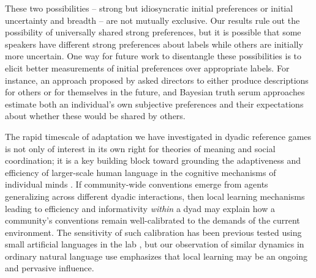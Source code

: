 \documentclass[alpha-refs]{wiley-article}
\begin{document}
These two possibilities -- strong but idiosyncratic initial preferences or initial uncertainty and breadth -- are not mutually exclusive.
Our results rule out the possibility of universally shared strong preferences, but it is possible that some speakers have different strong preferences about labels while others are initially more uncertain.
One way for future work to disentangle these possibilities is to elicit better measurements of initial preferences over appropriate labels.
For instance, an approach proposed by \cite{FussellKrauss89_IntendedAudienceCommonGround} asked directors to either produce descriptions for others or for themselves in the future, and Bayesian truth serum approaches \citep{prelec2004bayesian} estimate both an individual's own subjective preferences and their expectations about whether these would be shared by others.

The rapid timescale of adaptation we have investigated in dyadic reference games is not only of interest in its own right for theories of meaning and social coordination; it is a key building block toward grounding the adaptiveness and efficiency of larger-scale human language in the cognitive mechanisms of individual minds \citep{KirbyTamarizCornishSmith15_CompressionCommunication,gibson2019efficiency}.
If community-wide conventions emerge from agents generalizing across different dyadic interactions, then local learning mechanisms leading to efficiency and informativity \emph{within} a dyad may explain how a community's conventions remain well-calibrated to the demands of the current environment.
The sensitivity of such calibration has been previous tested using small artificial languages in the lab \cite[e.g.][]{WintersKirbySmith14_LanguagesAdapt,hawkins_emerging_abstractions_2018}, but our observation of similar dynamics in ordinary natural language use emphasizes that local learning may be an ongoing and pervasive influence.
\end{document}
